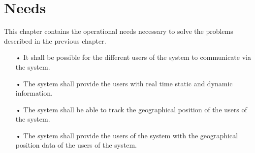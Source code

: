 \chapter{Needs}
This chapter contains the operational needs necessary to solve the problems described in the previous chapter. 

\begin{enumerate}
\item[•] It shall be possible for the different users of the system to communicate via the system. 
\item[•] The system shall provide the users with real time static and dynamic information. 
\item[•] The system shall be able to track the geographical position of the users of the system. 
\item[•] The system shall provide the users of the system with the geographical position data of the users of the system. 
\end{enumerate}
